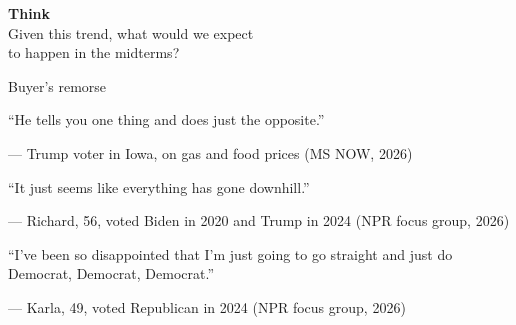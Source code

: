 \documentclass[aspectratio=169,11pt]{beamer}
\newenvironment{thinkframe}{%
  \begin{frame}[plain,noframenumbering,environment=thinkframe]\centering\Large}{\end{frame}}
\begin{document}
\begin{thinkframe}
  {\color{oldred}\textbf{Think}}\\[0.8em]
  Given this trend, what would we expect\\
  to happen in the midterms?
\end{thinkframe}

\begin{frame}{Buyer's remorse}
  \begin{textquote}
    ``He tells you one thing and does just the opposite.''
  \end{textquote}
  {\footnotesize\color{muted}\hfill --- Trump voter in Iowa, on gas and food prices (MS NOW, 2026)}
  \vspace{0.3em}
  \begin{textquote}
    ``It just seems like everything has gone downhill.''
  \end{textquote}
  {\footnotesize\color{muted}\hfill --- Richard, 56, voted Biden in 2020 and Trump in 2024 (NPR focus group, 2026)}
  \vspace{0.3em}
  \begin{textquote}
    ``I've been so disappointed that I'm just going to go straight and just do Democrat, Democrat, Democrat.''
  \end{textquote}
  {\footnotesize\color{muted}\hfill --- Karla, 49, voted Republican in 2024 (NPR focus group, 2026)}
\end{frame}
\end{document}
